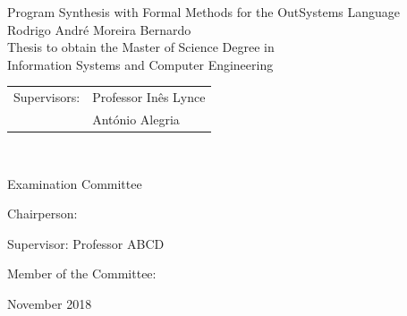 \begin{center}

\vspace{2.5cm}

\vspace{1.0cm}
{\FontLb Program Synthesis with Formal Methods for the OutSystems Language} \\
\vspace{2.7cm}
{\FontMb Rodrigo André Moreira Bernardo} \\
\vspace{2.0cm}
{\FontSn Thesis to obtain the Master of Science Degree in} \\
\vspace{0.3cm}
{\FontLb Information Systems and Computer Engineering} \\
\vspace{1.1cm}
{\FontSn %
\begin{tabular}{ll}
	Supervisors: & Professor Inês Lynce \\
	             & António Alegria \\
\end{tabular} } \\

\vspace{1.1cm}

{\FontMb Examination Committee} \\

\vspace{0.3cm}

{\FontSn %
Chairperson: 

Supervisor: Professor ABCD

Member of the Committee: 

}

\vspace{1.5cm}
{\FontMb November 2018} \\
%
\end{center}

\cleardoublepage


